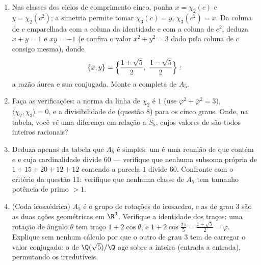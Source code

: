 \begin{problem}
\begin{enumerate}[resume]
        ortogonalidade das colunas (cada coluna não identidade contra a
        coluna da identidade, e cada coluna consigo mesma) determina
        seus valores fora dos ciclos de comprimento cinco: mostre que
        $\chi_2(g) = \chi_3(g) = -1$ nas transposições duplas e $0$ nos ciclos de
        comprimento três.
  \item Nas classes dos ciclos de comprimento cinco, ponha $x = \chi_2(c)$ e
        $y =
        \chi_2(c^2)$; a simetria permite tomar $\chi_3(c) = y$, $\chi_3(c^2) = x$. Da coluna de
        $c$ emparelhada com a coluna da identidade e com a coluna de
        $c^2$, deduza $x + y = 1$ e $xy = -1$ (e confira o valor $x^2 +
        y^2 = 3$ dado
        pela coluna de $c$ consigo mesma), donde
        \[
        \{x, y\} = \Bigl\{\frac{1 + \sqrt5}2,\ \frac{1 -
        \sqrt5}2\Bigr\} :
        \]
        a razão áurea e sua conjugada. Monte a 
        completa de $A_5$.
  \item Faça as verificações: a norma da linha de $\chi_2$ é
        $1$ (use $\varphi^2 + \bar\varphi^2 = 3$), $\langle\chi_2,
        \chi_3\rangle = 0$, e a divisibilidade de 
        (questão 8) para os cinco graus. Onde, na tabela, você
        \emph{vê} uma diferença em relação a $S_5$, cujos valores de
         são todos inteiros racionais?
  \item Deduza apenas da tabela que $A_5$ é simples: um  é uma reunião de  que contém
        $e$ e cuja cardinalidade divide $60$ --- verifique que
        nenhuma subsoma própria de $1 + 15 + 20 + 12 + 12$ contendo a parcela $1$
        divide $60$. Confronte com o critério da questão 11:
        verifique que nenhuma classe de $A_5$ tem tamanho potência
        de primo $> 1$.
  \item (Coda icosaédrica) $A_5$ é o grupo de rotações do
        icosaedro, e as  de grau $3$ são as duas ações
        geométricas em $\R^3$. Verifique a identidade dos traços:
        uma rotação de ângulo $\theta$ tem traço $1 +
        2\cos\theta$, e $1 + 2\cos\frac{2\pi}5 =
        \frac{1+\sqrt5}2 = \varphi$.
        Explique sem nenhum cálculo por que o outro  de grau
        $3$ tem de carregar o valor conjugado: o  de
        $\Q(\sqrt5)/\Q$ age sobre a  inteira (entrada a
        entrada), permutando os  irredutíveis.
\end{enumerate}


\end{problem}
